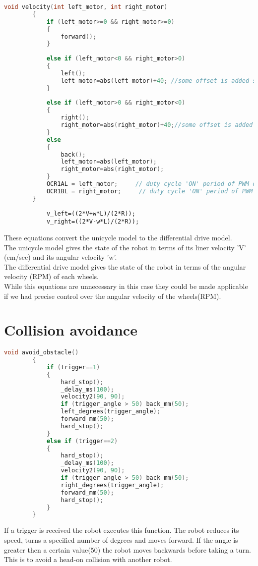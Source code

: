 \documentclass[main.tex]{subfiles}
\begin{document}
		\begin{lstlisting}[language=C, caption = velocity function]
		void velocity(int left_motor, int right_motor)
		{
			if (left_motor>=0 && right_motor>=0)
			{
				forward();
			}
			
			else if (left_motor<0 && right_motor>0)
			{
				left();
				left_motor=abs(left_motor)+40; //some offset is added so that the wheel still turns at lower values
			}
			
			else if (left_motor>0 && right_motor<0)
			{
				right();
				right_motor=abs(right_motor)+40;//some offset is added so that the wheel still turns at lower values
			}
			else 
			{
				back();
				left_motor=abs(left_motor);
				right_motor=abs(right_motor);
			}
			OCR1AL = left_motor;     // duty cycle 'ON' period of PWM out for Left motor
			OCR1BL = right_motor;     // duty cycle 'ON' period of PWM out for Right motor
		}
		\end{lstlisting}
		
		\pagebreak
		\begin{verbatim}
			v_left=((2*V+w*L)/(2*R));
			v_right=((2*V-w*L)/(2*R));
		\end{verbatim}
		
		These equations convert the unicycle model to the differential drive model.\\
		The unicycle model gives the state of the robot in terms of its liner velocity 'V' (cm/sec) and its angular velocity 'w'.\\
		The differential drive model gives the state of the robot in terms of the angular velocity (RPM) of each wheels.\\
		While this equations are unnecessary in this case they could be made applicable if we had precise control over the angular velocity of the wheels(RPM).\\
		
	\pagebreak
	\section{Collision avoidance}
	
	\begin{lstlisting}[language = C, caption = Collision avoidance function]
		void avoid_obstacle()
		{
			if (trigger==1)
			{
				hard_stop();
				_delay_ms(100);
				velocity2(90, 90);
				if (trigger_angle > 50) back_mm(50);
				left_degrees(trigger_angle);
				forward_mm(50);
				hard_stop();
			}
			else if (trigger==2)
			{
				hard_stop();
				_delay_ms(100);
				velocity2(90, 90);
				if (trigger_angle > 50)	back_mm(50);
				right_degrees(trigger_angle);
				forward_mm(50);
				hard_stop();
			}
		}
	\end{lstlisting}
	
	If a trigger is received the robot executes this function. The robot reduces its speed, turns a specified number of degrees and moves forward. If the angle is greater then a certain value(50) the robot moves backwards before taking a turn. This is to avoid a head-on collision with another robot.  
			
\end{document}
